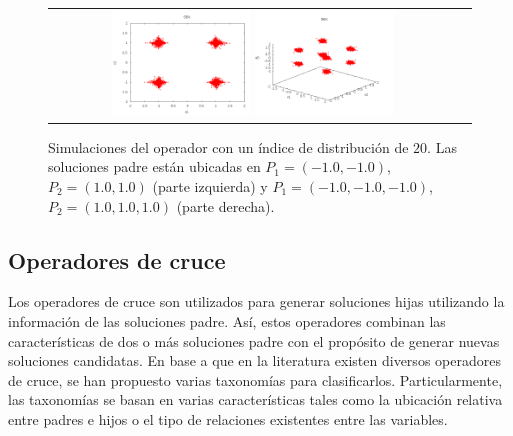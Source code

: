 %
\begin{figure}[!t]
\centering
\begin{tabular}{cc}
   \includegraphics[width=0.35\textwidth]{img/Operadores/SBX_eta_20_2D.png} 
   \includegraphics[width=0.35\textwidth]{img/Operadores/SBX_eta_20_3D.png} 
\end{tabular}
\caption{Simulaciones del operador \SBX{} con un índice de distribución de $20$. Las soluciones padre están ubicadas en $P_1=(-1.0, -1.0)$, $P_2=(1.0, 1.0)$ (parte izquierda) y $P_1=(-1.0, -1.0, -1.0)$, $P_2=(1.0, 1.0, 1.0)$ (parte derecha).}
\label{fig:Simulations_Index_20}
\end{figure}


\subsection{Operadores de cruce}

Los operadores de cruce son utilizados para generar soluciones hijas utilizando la información de las soluciones padre.
%
Así, estos operadores combinan las características de dos o más soluciones padre con el propósito de generar nuevas soluciones candidatas.
%
En base a que en la literatura existen diversos operadores de cruce, se han propuesto varias taxonomías para clasificarlos.
%
Particularmente, las taxonomías se basan en varias características tales como la ubicación relativa entre padres e hijos o el tipo 
de relaciones existentes entre las variables.

